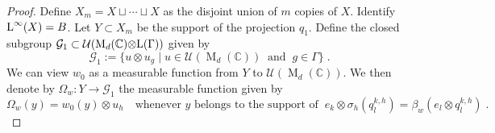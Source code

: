\documentclass[a4paper,11pt]{amsart}
\numberwithin{equation}{section}
\begin{document}
\begin{proof}
Define $X_m = X \sqcup \cdots \sqcup X$ as the disjoint union of $m$ copies of $X$. Identify ${\mathord{\text{\rm L}}}^\infty(X) = B$. Let $Y \subset X_m$ be the support of the projection $q_1$.
Define the closed subgroup ${\mathcal{G}}_1 \subset {\mathcal{U}}({\operatorname{M}}_d({\mathbb{C}}) {\otimes} {\mathord{\text{\rm L}}}(\Gamma))$ given by
$${\mathcal{G}}_1 := \{ u {\otimes} u_g \mid u \in {\mathcal{U}}({\operatorname{M}}_d({\mathbb{C}})) \;\;\text{and}\;\; g \in \Gamma \} \; .$$
We can view $w_0$ as a measurable function from $Y$ to ${\mathcal{U}}({\operatorname{M}}_d({\mathbb{C}}))$. We then denote by ${\Omega}_w : Y {\rightarrow} {\mathcal{G}}_1$ the measurable function given by
$${\Omega}_w(y) = w_0(y) {\otimes} u_h \quad\text{whenever $y$ belongs to the support of}\;\; e_k {\otimes} {\sigma}_h(q^{k,h}_l) = \beta_w(e_l {\otimes} q^{k,h}_l) \; .$$


\end{proof}
\end{document}
